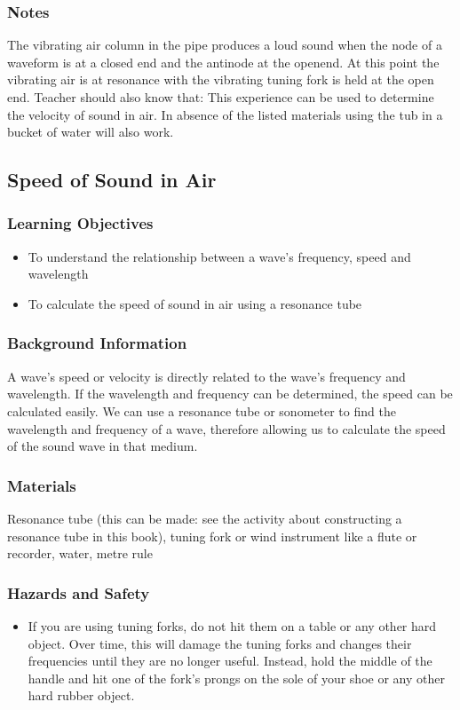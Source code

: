 \subsubsection*{Notes}
The vibrating air column in the pipe produces a loud sound when the node of a waveform is at a closed end and the antinode at the openend. At this point the vibrating air is at resonance with the vibrating tuning fork is held at the open end. 
Teacher should also know that: 
This experience can be used to determine the velocity of sound in air. In absence of the listed materials using the tub in a bucket of water will also work.  

\subsection{Speed of Sound in Air}

\subsubsection*{Learning Objectives}
\begin{itemize}
\item{To understand the relationship between a wave's frequency, speed and wavelength} 
\item{To calculate the speed of sound in air using a resonance tube} 
\end{itemize}

\subsubsection*{Background Information}
A wave's speed or velocity is directly related to the wave's frequency and wavelength. If the wavelength and frequency can be determined, the speed can be calculated easily. We can use a resonance tube or sonometer to find the wavelength and frequency of a wave, therefore allowing us to calculate the speed of the sound wave in that medium.  

\subsubsection*{Materials}
Resonance tube (this can be made: see the activity about constructing a resonance tube in this book), tuning fork or wind instrument like a flute or recorder, water, metre rule

\subsubsection*{Hazards and Safety}
\begin{itemize}
\item{If you are using tuning forks, do not hit them on a table or any other hard object. Over time, this will damage the tuning forks and changes their frequencies until they are no longer useful. Instead, hold the middle of the handle and hit one of the fork's prongs on the sole of your shoe or any other hard rubber object.} 
\end{itemize}


